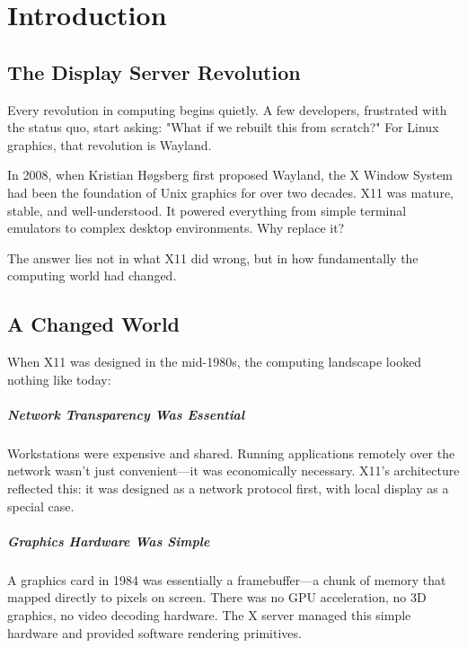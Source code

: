 
\chapter*{Introduction}

\section*{The Display Server Revolution}

Every revolution in computing begins quietly. A few developers, frustrated with the status quo, start asking: "What if we rebuilt this from scratch?" For Linux graphics, that revolution is Wayland.

In 2008, when Kristian Høgsberg first proposed Wayland, the X Window System had been the foundation of Unix graphics for over two decades. X11 was mature, stable, and well-understood. It powered everything from simple terminal emulators to complex desktop environments. Why replace it?

The answer lies not in what X11 did wrong, but in how fundamentally the computing world had changed.

\section*{A Changed World}

When X11 was designed in the mid-1980s, the computing landscape looked nothing like today:

\paragraph{Network Transparency Was Essential} Workstations were expensive and shared. Running applications remotely over the network wasn't just convenient—it was economically necessary. X11's architecture reflected this: it was designed as a network protocol first, with local display as a special case.

\paragraph{Graphics Hardware Was Simple} A graphics card in 1984 was essentially a framebuffer—a chunk of memory that mapped directly to pixels on screen. There was no GPU acceleration, no 3D graphics, no video decoding hardware. The X server managed this simple hardware and provided software rendering primitives.

